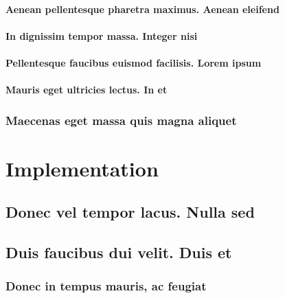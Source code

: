 \documentclass[%
  english,%
]{doctorate}
\begin{document}
\lipsum[1-8]

\subsubsection{Aenean pellentesque pharetra maximus. Aenean eleifend}

\lipsum[1-8]

\subsubsection{In dignissim tempor massa. Integer nisi}

\lipsum[1-8]

\subsubsection{Pellentesque faucibus euismod facilisis. Lorem ipsum}

\lipsum[1-8]

\subsubsection{Mauris eget ultricies lectus. In et}

\lipsum[1-8]

\subsection{Maecenas eget massa quis magna aliquet}

\lipsum[1-8]





\chapter{Implementation}

\lipsum[1-8]

\section{Donec vel tempor lacus. Nulla sed}

\lipsum[1-8]

\section{Duis faucibus dui velit. Duis et}

\lipsum[1-8]

\subsection{Donec in tempus mauris, ac feugiat}
\end{document}
